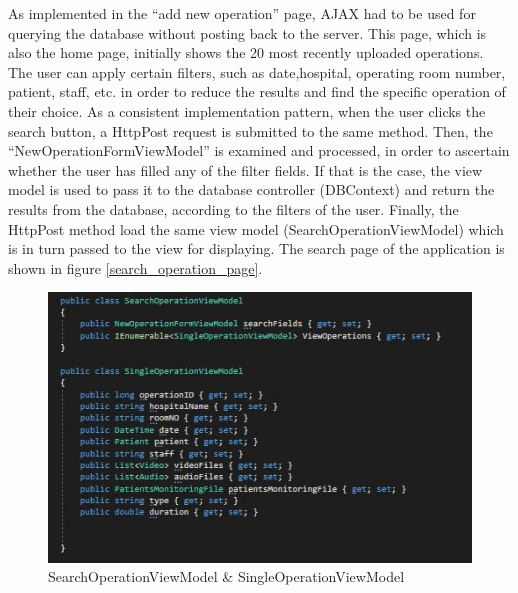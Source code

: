 As implemented in the ``add new operation'' page, AJAX had to be used for querying the database without posting back to the server. This page, which is also the home page, initially shows the 20 most recently uploaded operations. The user can apply certain filters, such as date,hospital, operating room number, patient, staff, etc. in order to reduce the results and find the specific operation of their choice. As a consistent implementation pattern, when the user clicks the search button, a HttpPost request is submitted to the same method. Then, the ``NewOperationFormViewModel'' is examined and processed, in order to ascertain whether the user has filled any of the filter fields. If that is the case, the view model is used to pass it to the database controller (DBContext) and return the results from the database, according to the filters of the user. Finally, the HttpPost method load the same view model (SearchOperationViewModel) which is in turn passed to the view for displaying. The search page of the application is shown in figure \ref{search_operation_page}.

\begin{figure}[!ht]
\begin{center}
\includegraphics[width=17cm]{imgs/two_view_models.jpg}
\end{center}\vspace{-0.3cm}
\caption[SearchOperationViewModel \& SingleOperationViewModel]{SearchOperationViewModel \& SingleOperationViewModel} \label{two_view_models}
\end{figure}

